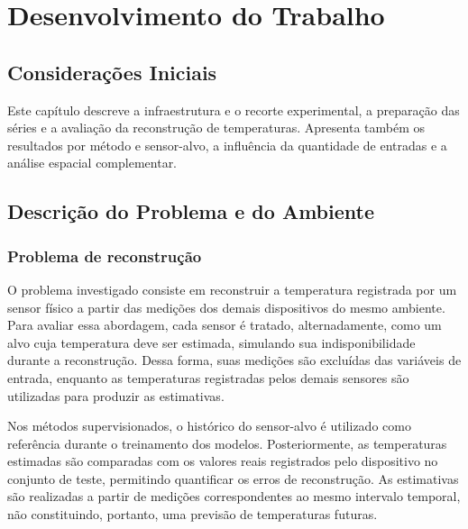 \chapter{Desenvolvimento do Trabalho}
\label{sec:desenvolvimento}

\section{Considerações Iniciais}
\label{sec:desenvolvimento_iniciais}

Este capítulo descreve a infraestrutura e o recorte experimental,
a preparação das séries e a avaliação da reconstrução de temperaturas.
Apresenta também os resultados por método e sensor-alvo, a influência
da quantidade de entradas e a análise espacial complementar.

\section{Descrição do Problema e do Ambiente}
\label{sec:descricao_projeto}

\subsection{Problema de reconstrução}
\label{subsec:contextualizacao_problema}
\label{subsec:proposta_reconstrucao}


O problema investigado consiste em reconstruir a temperatura registrada por um sensor físico a partir das medições dos demais dispositivos do mesmo ambiente. Para avaliar essa abordagem, cada sensor é tratado, alternadamente, como um alvo cuja temperatura deve ser estimada, simulando sua indisponibilidade durante a reconstrução. Dessa forma, suas medições são excluídas das variáveis de entrada, enquanto as temperaturas registradas pelos demais sensores são utilizadas para produzir as estimativas.

Nos métodos supervisionados, o histórico do sensor-alvo é utilizado como referência durante o treinamento dos modelos. Posteriormente, as temperaturas estimadas são comparadas com os valores reais registrados pelo dispositivo no conjunto de teste, permitindo quantificar os erros de reconstrução. As estimativas são realizadas a partir de medições correspondentes ao mesmo intervalo temporal, não constituindo, portanto, uma previsão de temperaturas futuras.

